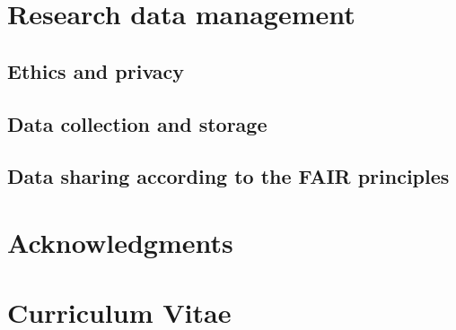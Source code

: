 \clearpage
\thispagestyle{nohead}
\section*{Research data management}
\subsection*{Ethics and privacy}

\subsection*{Data collection and storage}

\subsection*{Data sharing according to the FAIR principles}

\clearpage
\thispagestyle{nohead}
\section*{Acknowledgments}

\clearpage
\thispagestyle{nohead}
\section*{Curriculum Vitae}
